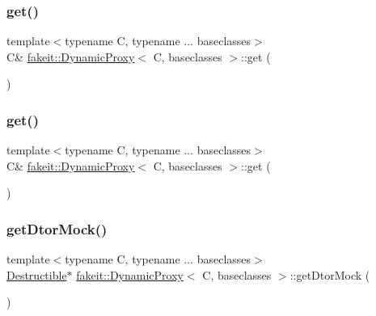 \subsubsection{\texorpdfstring{get()}{get()}\hspace{0.1cm}{\footnotesize\ttfamily [8/9]}}
{\footnotesize\ttfamily template$<$typename C, typename ... baseclasses$>$ \\
C\& \mbox{\hyperlink{structfakeit_1_1DynamicProxy}{fakeit\+::\+Dynamic\+Proxy}}$<$ C, baseclasses $>$\+::get (\begin{DoxyParamCaption}{ }\end{DoxyParamCaption})\hspace{0.3cm}{\ttfamily [inline]}}

\mbox{\label{structfakeit_1_1DynamicProxy_af8e4100c2d995a26bf3209e68c11d12a}} 
\subsubsection{\texorpdfstring{get()}{get()}\hspace{0.1cm}{\footnotesize\ttfamily [9/9]}}
{\footnotesize\ttfamily template$<$typename C, typename ... baseclasses$>$ \\
C\& \mbox{\hyperlink{structfakeit_1_1DynamicProxy}{fakeit\+::\+Dynamic\+Proxy}}$<$ C, baseclasses $>$\+::get (\begin{DoxyParamCaption}{ }\end{DoxyParamCaption})\hspace{0.3cm}{\ttfamily [inline]}}

\mbox{\label{structfakeit_1_1DynamicProxy_a32f8a09734ef6d70162d682fd593707b}} 
\subsubsection{\texorpdfstring{getDtorMock()}{getDtorMock()}\hspace{0.1cm}{\footnotesize\ttfamily [1/9]}}
{\footnotesize\ttfamily template$<$typename C, typename ... baseclasses$>$ \\
\mbox{\hyperlink{classfakeit_1_1Destructible}{Destructible}}$\ast$ \mbox{\hyperlink{structfakeit_1_1DynamicProxy}{fakeit\+::\+Dynamic\+Proxy}}$<$ C, baseclasses $>$\+::get\+Dtor\+Mock (\begin{DoxyParamCaption}{ }\end{DoxyParamCaption})\hspace{0.3cm}{\ttfamily [inline]}}

